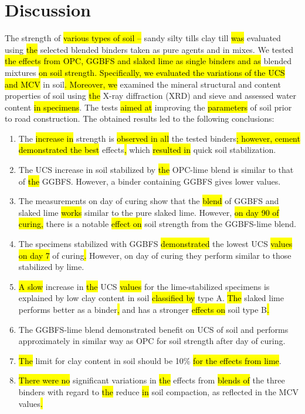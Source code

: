 \documentclass[electronics,article,submit,pdftex,moreauthors]{Definitions/mdpi}
\begin{document}
\section{Discussion}

The strength\hl{ }of \hl{various types of soil --} sandy silty tills\hl{ }clay till \hl{was} evaluated using \hl{the} selected blended binders taken as pure agents and in mixes. We tested \hl{the effects from OPC, GGBFS and slaked lime as single binders and as} blended mixtures \hl{on soil strength. Specifically, we evaluated the variations of the UCS and MCV} in\hl{ }soil\hl{. Moreover, we }examined the mineral structural and content properties of\hl{ }soil using \hl{the} X-ray diffraction (XRD) and\hl{ }sieve and assessed\hl{ }water content \hl{in specimens}. The tests \hl{aimed at} improving the \hl{parameters} of soil prior to road construction. The obtained results led to the following conclusions:

\begin{enumerate}
   \item The \hl{increase in} strength is \hl{observed in all} the tested binders\hl{; however, cement demonstrated the best }effects\hl{, }which \hl{resulted in }quick soil stabilization.
   \item The UCS increase in soil stabilized by \hl{the} OPC-lime blend is similar to that of \hl{the} GGBFS. However, a binder containing GGBFS gives lower values.  
   \item The measurements on day  of curing show that the \hl{blend} of GGBFS and slaked lime \hl{works} similar to the pure slaked lime. However, \hl{on day 90 of curing, }there is a notable \hl{effect on} soil strength from the GGBFS-lime blend. 
   \item The specimens stabilized with GGBFS \hl{demonstrated} the lowest UCS \hl{values on day 7} of curing\hl{. }However, on  day of curing they perform similar to those stabilized by lime.
   \item \hl{A slow} increase in \hl{the} UCS \hl{values} for the lime-stabilized specimens is explained by low clay content in soil \hl{classified by} type A. \hl{The} slaked lime performs better as a binder\hl{, }and has a stronger \hl{effects on} soil type B\hl{.}
   \item The GGBFS-lime blend demonstrated benefit on UCS of soil and performs approximately in similar way as OPC for soil strength after  day of curing.	
   \item \hl{The} limit for clay content in soil should be\hl{ }10\% \hl{for the effects from lime}.
   \item \hl{There were no} significant variations in \hl{the} effects from \hl{blends of} the three binders with regard to \hl{the} reduce \hl{in} soil compaction, as reflected in the MCV values\hl{.}
 \end{enumerate}
\end{document}

